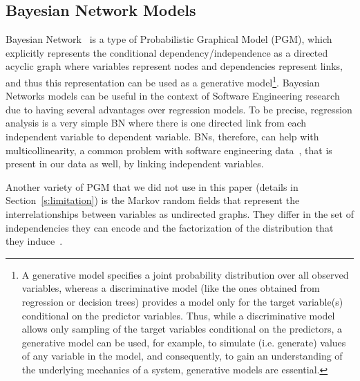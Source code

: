 \documentclass[smallcondensed]{svjour3}     %
\begin{document}
\subsection{Bayesian Network Models}
Bayesian Network~\cite{koller2009probabilistic,scutari2010introduction} 
is a type of Probabilistic Graphical Model (PGM), which explicitly represents the
conditional dependency/independence as a directed acyclic graph where variables
represent nodes and dependencies represent links, and thus this
representation can be used as a generative model\footnote{A
  generative model specifies a joint probability distribution over
  all observed variables, whereas a discriminative model
  (like the ones obtained from regression or decision trees) provides a
  model only for the target variable(s) conditional on the predictor
  variables. Thus, while a discriminative model allows only sampling
  of the target variables conditional on the predictors, a
  generative model can be used, for example, to simulate
  (i.e. generate) values of any variable in the model, and
  consequently, to gain an understanding of the underlying mechanics
  of a system, generative models are essential.}.  
Bayesian Networks models can be useful in the context of Software Engineering research~\cite{fenton1999critique} due to having several advantages over
regression models. To be precise, regression analysis is a very
simple BN where there is one directed link from each independent variable
to dependent variable. BNs, therefore, can help with 
multicollinearity, a common problem with software engineering 
data~\cite{yu2002predicting,subramanyam2003empirical,briand2000exploring,Changes07}, 
that is present in our data as well, by linking independent variables. 

Another variety of PGM that we did not use in this paper 
(details in Section~\ref{s:limitation}) is the Markov random
fields that represent the interrelationships between variables 
as undirected graphs. They differ in the set of
independencies they can encode and the factorization of the
distribution that they induce~\cite{koller2009probabilistic}.
\end{document}
